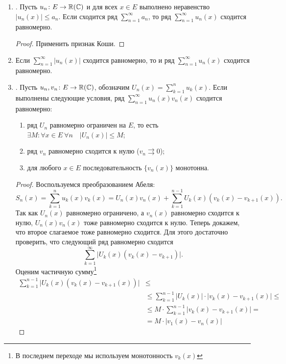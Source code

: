 \begin{prop}
\begin{enumerate}
		\item {}. Пусть $ u_n\colon E \to  \mathbb{R}(\mathbb{C})$ и для всех $ x \in E$ выполнено неравенство $ \lvert u_n(x)  \rvert \le a_n$. Если сходится ряд $ \sum_{n=1}^{\infty} a_n$, то ряд $ \sum_{n=1}^{\infty} u_n(x)$ сходится равномерно.
			\begin{proof}
				Применить признак Коши.
			\end{proof}
		\item Если $ \sum_{n=1}^{\infty} \lvert u_n(x) \rvert $ сходится равномерно, то и ряд $ \sum_{n=1}^{\infty} u_n(x)$ сходится равномерно.
		\item {}. Пусть $ u_n, v_n \colon E \to \mathbb{R}(\mathbb{C})$, обозначим  $ U_n(x) = \sum_{k=1}^{n} u_k(x)$. Если выполнены следующие условия, ряд $ \sum_{n=1}^{\infty} u_n(x)v_n(x)$ сходится равномерно:
			\begin{enumerate}[noitemsep]
				\item ряд $ U_n$ равномерно ограничен на $ E$, то есть
					$
					\exists M\colon \forall x \in E ~ \forall n \quad \lvert U_n(x) \rvert \le M
					$;
				\item ряд $ v_n$ равномерно сходится к нулю ($ v_n \rightrightarrows 0$);
				\item для любого $ x \in E$ последовательность $ \{v_n(x)\}$ монотонна.
			\end{enumerate}
			\begin{proof}
				Воспользуемся преобразованием Абеля:
				\[
					S_n(x) = \sum_{k=1}^{n} u_k(x)v_k(x) = U_n(x)v_n(x) + \sum_{k=1}^{n-1} U_k(x) (v_k(x) - v_{k+1}(x))
				.\]
				Так как  $ U_n(x)$ равномерно ограничено, а $ v_n(x) $ равномерно сходится к нулю, $ U_n(x)v_n(x)$ тоже равномерно сходится к нулю. Теперь докажем, что второе слагаемое тоже равномерно сходится. Для этого достаточно проверить, что следующий ряд равномерно сходится
				\[
					\sum_{k=1}^{\infty} \lvert U_k(x) (v_k(x) - v_{k+1}) \rvert
				.\]
				Оценим частичную сумму\footnote{В последнем переходе мы используем монотонность $ v_k(x)$}
				\[
					\begin{aligned}
						\sum_{k=1}^{n-1} \lvert U_k(x) (v_k(x) - v_{k+1}(x)) \rvert & \le \\
																					& \le \sum_{k=1}^{n-1} \lvert U_k(x) \rvert \cdot \lvert v_k(x) - v_{k+1}(x) \rvert \le  \\
																					& \le M \cdot \sum_{k=1}^{n-1} \lvert v_k(x) - v_{k+1}(x) \rvert = \\
																					& = M \cdot \lvert v_1(x) - v_n(x) \rvert

\end{aligned}\]
\end{proof}
\end{enumerate}
\end{prop}
